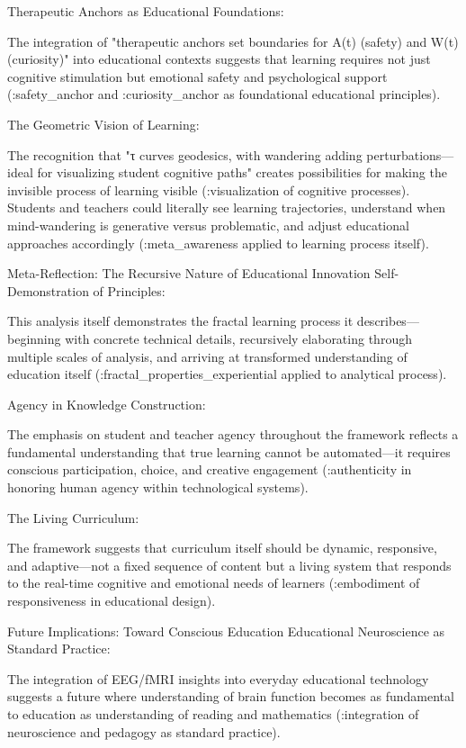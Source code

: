 Therapeutic Anchors as Educational Foundations:

The integration of "therapeutic anchors set boundaries for A(t) (safety) and W(t) (curiosity)" into educational contexts suggests that learning requires not just cognitive stimulation but emotional safety and psychological support (:safety_anchor and :curiosity_anchor as foundational educational principles).

The Geometric Vision of Learning:

The recognition that "τ curves geodesics, with wandering adding perturbations—ideal for visualizing student cognitive paths" creates possibilities for making the invisible process of learning visible (:visualization of cognitive processes). Students and teachers could literally see learning trajectories, understand when mind-wandering is generative versus problematic, and adjust educational approaches accordingly (:meta_awareness applied to learning process itself).

Meta-Reflection: The Recursive Nature of Educational Innovation
Self-Demonstration of Principles:

This analysis itself demonstrates the fractal learning process it describes—beginning with concrete technical details, recursively elaborating through multiple scales of analysis, and arriving at transformed understanding of education itself (:fractal_properties_experiential applied to analytical process).

Agency in Knowledge Construction:

The emphasis on student and teacher agency throughout the framework reflects a fundamental understanding that true learning cannot be automated—it requires conscious participation, choice, and creative engagement (:authenticity in honoring human agency within technological systems).

The Living Curriculum:

The framework suggests that curriculum itself should be dynamic, responsive, and adaptive—not a fixed sequence of content but a living system that responds to the real-time cognitive and emotional needs of learners (:embodiment of responsiveness in educational design).

Future Implications: Toward Conscious Education
Educational Neuroscience as Standard Practice:

The integration of EEG/fMRI insights into everyday educational technology suggests a future where understanding of brain function becomes as fundamental to education as understanding of reading and mathematics (:integration of neuroscience and pedagogy as standard practice).

